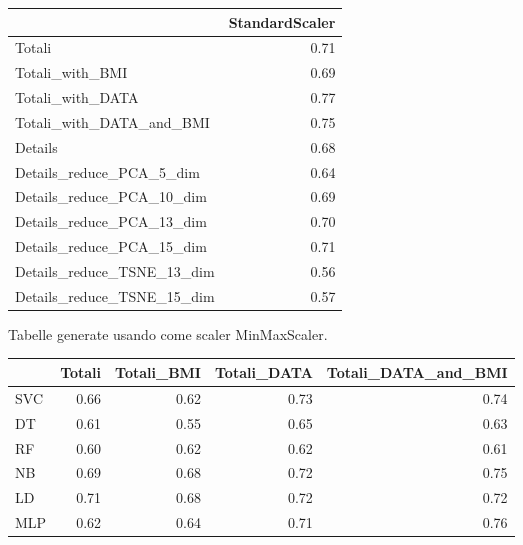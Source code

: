 \documentclass[12pt,italian]{report}
\begin{document}
\begin{table}[h]
	\begin{center}
		\begin{adjustbox}{max width=\textwidth, max totalheight= {5.5cm}}
			\begin{tabular}{lr}
				\toprule
				{} &  StandardScaler \\
				\midrule
				Totali                     &        0.71 \\
				Totali\_with\_BMI            &        0.69 \\
				Totali\_with\_DATA           &        \cellcolor{orange}0.77 \\
				Totali\_with\_DATA\_and\_BMI   &        0.75 \\
				Details                    &        0.68 \\
				Details\_reduce\_PCA\_5\_dim   &        0.64 \\
				Details\_reduce\_PCA\_10\_dim  &        0.69 \\
				Details\_reduce\_PCA\_13\_dim  &        0.70 \\
				Details\_reduce\_PCA\_15\_dim  &        0.71 \\
				Details\_reduce\_TSNE\_13\_dim &        0.56 \\
				Details\_reduce\_TSNE\_15\_dim &        0.57 \\
				\bottomrule
			\end{tabular}
		\end{adjustbox}
	\end{center}
\end{table}

\newpage

Tabelle generate usando come scaler MinMaxScaler.
\begin{table}[h]
	\begin{center}
		\begin{adjustbox}{max width=\textwidth, max totalheight= {3.3cm}}
			\begin{tabular}{lrrrr}
				\toprule
				{} &    Totali &  Totali\_BMI &  Totali\_DATA &  Totali\_DATA\_and\_BMI \\
				\midrule
				SVC &  0.66 &         0.62 &          0.73 &                  \cellcolor{cyan}0.74 \\
				DT  &  0.61 &         0.55 &          0.65 &                  0.63 \\
				RF  &  0.60 &         0.62 &          0.62 &                  0.61 \\
				NB  &  0.69 &         0.68 &          0.72 &                  \cellcolor{cyan}0.75 \\
				LD  &  0.71 &         0.68 &          \cellcolor{cyan}0.72 &                  0.72\\
				MLP &  0.62 &         0.64 &          0.71 &                  \cellcolor{orange}0.76\\
				\bottomrule
			\end{tabular}
		\end{adjustbox}
	\end{center}
\end{table}
\end{document}
